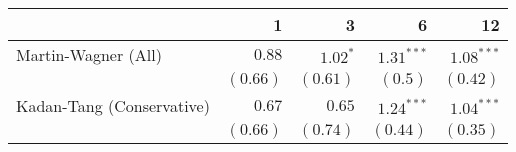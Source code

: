 \begin{tabular}{lrrrr}
\toprule
                                  &         1 &         3 &         6 &        12 \\
\midrule
Martin-Wagner (All)  & $0.88$ & $1.02^{*}$ & $1.31^{***}$ & $1.08^{***}$ \\
 & $(0.66)$ & $(0.61)$ & $(0.5)$ & $(0.42)$ \\
Kadan-Tang (Conservative)  & $0.67$ & $0.65$ & $1.24^{***}$ & $1.04^{***}$ \\
 & $(0.66)$ & $(0.74)$ & $(0.44)$ & $(0.35)$ \\
\bottomrule
\end{tabular}
\\
